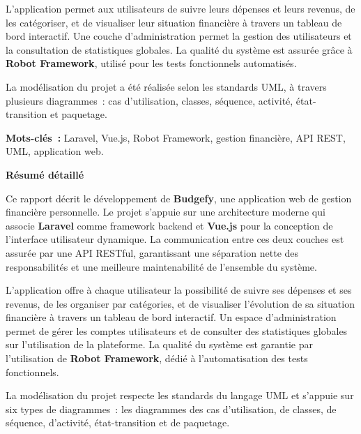 \documentclass{rapportPFA}
\begin{document}
L'application permet aux utilisateurs de suivre leurs d\'epenses et leurs revenus,
de les cat\'egoriser, et de visualiser leur situation financi\`ere \`a travers un
tableau de bord interactif. Une couche d'administration permet la gestion des
utilisateurs et la consultation de statistiques globales. La qualit\'e du syst\`eme
est assur\'ee gr\^ace \`a \textbf{Robot Framework}, utilis\'e pour les tests
fonctionnels automatis\'es.

La mod\'elisation du projet a \'et\'e r\'ealis\'ee selon les standards UML, \`a
travers plusieurs diagrammes~: cas d'utilisation, classes, s\'equence, activit\'e,
\'etat-transition et paquetage.

\textbf{Mots-cl\'es~:} Laravel, Vue.js, Robot Framework, gestion financi\`ere,
API REST, UML, application web.

\newpage
\thispagestyle{empty}
{}
\vspace*{3cm}
\begin{center}
    {\LARGE \textbf{R\'esum\'e d\'etaill\'e}}
\end{center}
\vspace{2cm}

Ce rapport d\'ecrit le d\'eveloppement de \textbf{Budgefy}, une application web de
gestion financi\`ere personnelle. Le projet s'appuie sur une architecture moderne qui
associe \textbf{Laravel} comme framework backend et \textbf{Vue.js} pour la conception
de l'interface utilisateur dynamique. La communication entre ces deux couches est
assur\'ee par une API RESTful, garantissant une s\'eparation nette des responsabilit\'es
et une meilleure maintenabilit\'e de l'ensemble du syst\`eme.

L'application offre \`a chaque utilisateur la possibilit\'e de suivre ses d\'epenses
et ses revenus, de les organiser par cat\'egories, et de visualiser l'\'evolution de
sa situation financi\`ere \`a travers un tableau de bord interactif. Un espace
d'administration permet de g\'erer les comptes utilisateurs et de consulter des
statistiques globales sur l'utilisation de la plateforme. La qualit\'e du syst\`eme
est garantie par l'utilisation de \textbf{Robot Framework}, d\'edi\'e \`a
l'automatisation des tests fonctionnels.

La mod\'elisation du projet respecte les standards du langage UML et s'appuie sur
six types de diagrammes~: les diagrammes des cas d'utilisation, de classes, de
s\'equence, d'activit\'e, \'etat-transition et de paquetage.
\end{document}
